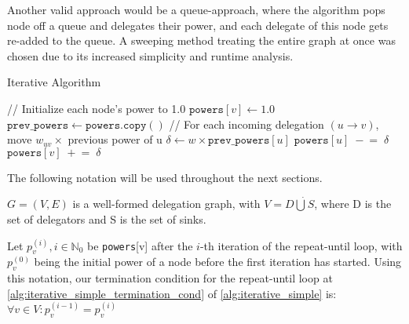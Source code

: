 
Another valid approach would be a queue-approach, where the algorithm pops node off a queue and delegates their power, and each delegate of this node gets re-added to the queue. A sweeping method treating the entire graph at once was chosen due to its increased simplicity and runtime analysis.

\begin{algorithm} [t]
 \caption{Iterative Algorithm}\label{alg:iterative_simple}
\begin{algorithmic}[1]
\State // Initialize each node’s power to 1.0  
    \State \(\texttt{powers}[v] \gets 1.0\)
\EndFor
\Repeat
    \State \(\texttt{prev\_powers} \gets \texttt{powers}.\texttt{copy}()\)  
        \State // For each incoming delegation \((u \to v)\), move \(w_{uv}\times\) previous power of u
            \State \(\delta \gets w \times \texttt{prev\_powers}[u]\) \label{alg:iterative_simple_delta_assignment}
            \State \(\texttt{powers}[u] \;-\!=\; \delta\) \label{alg:iterative_simple_remove_delta}
            \State \(\texttt{powers}[v] \;+\!=\; \delta\) \label{alg:iterative_simple_add_delta}
        \EndFor
    \EndFor
{} \label{alg:iterative_simple_termination_cond}
\end{algorithmic}
\end{algorithm}

The following notation will be used throughout the next sections.

$G = (V, E)$ is a well-formed delegation graph, with $V = D \dot\bigcup S$, where D is the set of delegators and S is the set of sinks.

Let $p_v^{(i)}, i \in \mathbb{N}_0$ be \texttt{powers}[v] after the $i$-th iteration of the repeat-until loop, with $p_v^{(0)}$ being the initial power of a node before the first iteration has started. Using this notation, our termination condition for the repeat-until loop at \cref{alg:iterative_simple_termination_cond} of \cref{alg:iterative_simple} is: $\forall v \in V: p_v^{(i-1)} = p_v^{(i)}$

